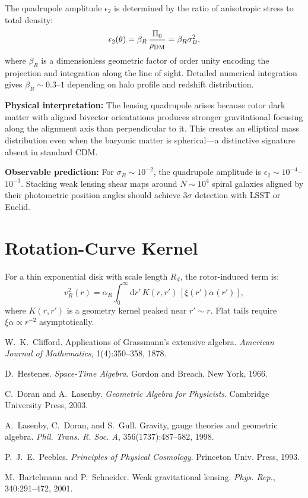\documentclass[11pt,a4paper]{article}
\numberwithin{equation}{section}
\theoremstyle{plain}
\theoremstyle{definition}
\theoremstyle{remark}
\newcommand{\dd}{\mathrm{d}}
\begin{document}
The quadrupole amplitude $\epsilon_2$ is determined by the ratio of anisotropic stress to total density:
\begin{equation}
\epsilon_2(\theta) = \beta_R\,\frac{\Pi_0}{\rho_{\rm DM}} = \beta_R\sigma_B^2,
\end{equation}
where $\beta_R$ is a dimensionless geometric factor of order unity encoding the projection and integration along the line of sight. Detailed numerical integration gives $\beta_R \sim 0.3$--$1$ depending on halo profile and redshift distribution.

\textbf{Physical interpretation:} The lensing quadrupole arises because rotor dark matter with aligned bivector orientations produces stronger gravitational focusing along the alignment axis than perpendicular to it. This creates an elliptical mass distribution even when the baryonic matter is spherical---a distinctive signature absent in standard CDM.

\textbf{Observable prediction:} For $\sigma_B \sim 10^{-2}$, the quadrupole amplitude is $\epsilon_2 \sim 10^{-4}$--$10^{-3}$. Stacking weak lensing shear maps around $N \sim 10^4$ spiral galaxies aligned by their photometric position angles should achieve $3\sigma$ detection with LSST or Euclid.

\section{Rotation-Curve Kernel}\label{app:rc}

For a thin exponential disk with scale length $R_d$, the rotor-induced term is:
\begin{equation}
v_R^2(r)=\alpha_R \int_0^\infty \dd r'\,K(r,r')\,[\xi(r')\alpha(r')],
\end{equation}
where $K(r,r')$ is a geometry kernel peaked near $r'\!\sim\!r$. Flat tails require $\xi\alpha \propto r^{-2}$ asymptotically.

\begin{thebibliography}{9}

W.~K.~Clifford.
\newblock Applications of Grassmann's extensive algebra.
\newblock \emph{American Journal of Mathematics}, 1(4):350--358, 1878.

D.~Hestenes.
\newblock \emph{Space-Time Algebra}.
\newblock Gordon and Breach, New York, 1966.

C.~Doran and A.~Lasenby.
\newblock \emph{Geometric Algebra for Physicists}.
\newblock Cambridge University Press, 2003.

A.~Lasenby, C.~Doran, and S.~Gull.
\newblock Gravity, gauge theories and geometric algebra.
\newblock \emph{Phil. Trans. R. Soc. A}, 356(1737):487--582, 1998.

P.~J.~E.~Peebles.
\newblock \emph{Principles of Physical Cosmology}.
\newblock Princeton Univ. Press, 1993.

M.~Bartelmann and P.~Schneider.
\newblock Weak gravitational lensing.
\newblock \emph{Phys. Rep.}, 340:291--472, 2001.

\end{thebibliography}
\end{document}
